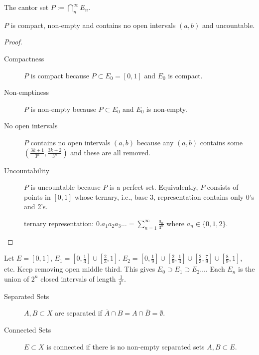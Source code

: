 \begin{definition}
	The cantor set $P:=\bigcap_{n}^{\infty} E_{n} $.
\end{definition}
\begin{proposition}
	$P$ is compact, non-empty and contains no open intervals $(a,b)$ and uncountable.
	\begin{proof}
		\begin{description}
			\item[Compactness]
			      $P$ is compact because $P \subset E_0=[0,1]$ and $E_0$ is compact.
			\item[Non-emptiness]
			      $P$ is non-empty because $P \subset E_0$ and $E_0$ is non-empty.
			\item[No open intervals]
			      $P$ contains no open intervals $(a,b)$ because any $(a,b)$ contains some $(\frac{3k+1}{3^{n}},\frac{3k+2}{3^{n}})$ and these are all removed.
			\item[Uncountability]
			      $P$ is uncountable because $P$ is a perfect set. Equivalently, $P$ consists of points in $[0,1]$ whose ternary, i.e., base 3, representation contains only 0's and 2's.
			      \begin{note}
				      ternary representation: $0.a_1 a_2 a_3 \ldots = \sum_{n=1}^{\infty} \frac{a_n}{3^{n}}$ where $a_n \in \{0,1,2\}$.
			      \end{note}

		\end{description}
	\end{proof}
\end{proposition}

\begin{example}
	Let $E=[0,1]$, $E_1=[0,\frac{1}{3}] \cup [\frac{2}{3},1]$.
	$E_2=[0,\frac{1}{9}]\cup [\frac{2}{9},\frac{1}{3}] \cup [\frac{2}{3},\frac{7}{9}] \cup [\frac{8}{9},1]$, etc. Keep removing open middle third. This gives $E_0 \supset E_1 \supset E_2\ldots $. Each $E_n$ is the union of $2^{n}$ closed intervals of length $\frac{1}{3^{n}}$.
\end{example}


\begin{definition}
	\begin{description}
		\item[Separated Sets\label{def:sepratedSets}]
		      $A,B \subset X$ are separated if $\overline{A} \cap B = A \cap \overline{B} = \emptyset$.
		\item[Connected Sets\label{def:connectedSets}]
		      $E \subset X$ is connected if there is no non-empty separated sets $A,B \subset E$.
	\end{description}
\end{definition}

